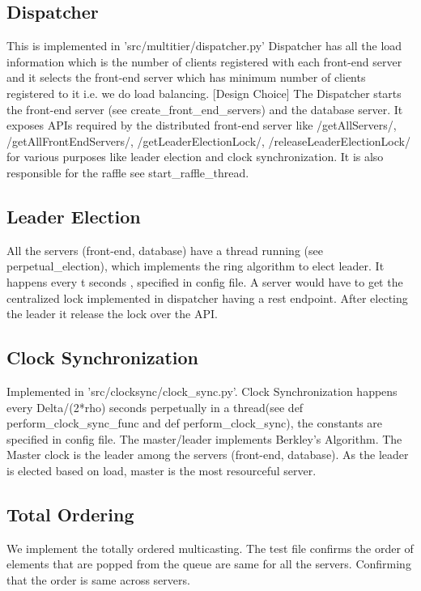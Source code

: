 \documentclass{article}
\begin{document}
\subsection{Dispatcher}
This is implemented in 'src/multitier/dispatcher.py' Dispatcher has all the load information which is the number of clients registered with each front-end server and it selects the front-end server which has minimum number of clients registered to it i.e. we do load balancing. [Design Choice] The Dispatcher starts the front-end server (see create\_front\_end\_servers) and the database server. It exposes APIs required by the distributed front-end server like /getAllServers/, /getAllFrontEndServers/, /getLeaderElectionLock/, /releaseLeaderElectionLock/ for various purposes like leader election and clock synchronization. 
It is also responsible for the raffle see start\_raffle\_thread.

\subsection{Leader Election}

All the servers (front-end, database) have a thread running (see perpetual\_election), which implements the ring algorithm to elect leader. It happens every t seconds , specified in config file. A server would have to get the centralized lock implemented in dispatcher having a rest endpoint. After electing the leader it release the lock over the API.


\subsection{Clock Synchronization}
Implemented in 'src/clocksync/clock\_sync.py'. Clock Synchronization happens every Delta/(2*rho) seconds perpetually in a thread(see def perform\_clock\_sync\_func and def perform\_clock\_sync), the constants are specified in config file. The master/leader implements Berkley's Algorithm. The Master clock is the leader among the servers (front-end, database). As the leader is elected based on load, master is the most resourceful server.


\subsection{Total Ordering}
We implement the totally ordered multicasting. The test file confirms the order of elements that are popped from the queue are same for all the servers. Confirming that the order is same across servers.
\end{document}
